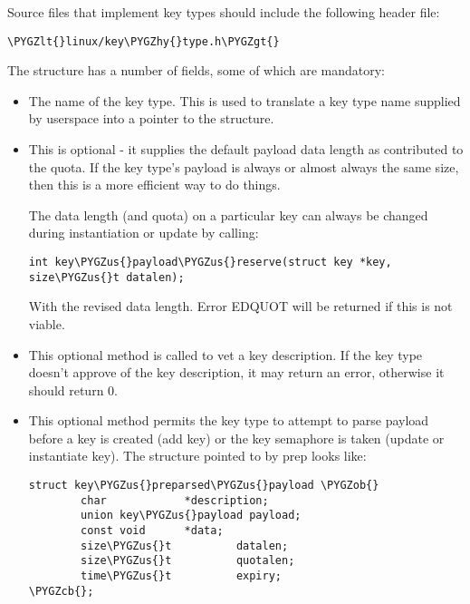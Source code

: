 \documentclass[a4paper,8pt,english]{sphinxmanual}
\def\PYGZus{\char`\_}
\def\PYGZob{\char`\{}
\def\PYGZcb{\char`\}}
\def\PYGZlt{\char`\<}
\def\PYGZgt{\char`\>}
\def\PYGZhy{\char`\-}
\begin{document}
Source files that implement key types should include the following header file:

\begin{Verbatim}[commandchars=\\\{\}]
\PYGZlt{}linux/key\PYGZhy{}type.h\PYGZgt{}
\end{Verbatim}

The structure has a number of fields, some of which are mandatory:
\begin{itemize}
\item {} 

The name of the key type. This is used to translate a key type name
supplied by userspace into a pointer to the structure.

\item {} 

This is optional - it supplies the default payload data length as
contributed to the quota. If the key type's payload is always or almost
always the same size, then this is a more efficient way to do things.

The data length (and quota) on a particular key can always be changed
during instantiation or update by calling:

\begin{Verbatim}[commandchars=\\\{\}]
int key\PYGZus{}payload\PYGZus{}reserve(struct key *key, size\PYGZus{}t datalen);
\end{Verbatim}

With the revised data length. Error EDQUOT will be returned if this is not
viable.

\item {} 

This optional method is called to vet a key description.  If the key type
doesn't approve of the key description, it may return an error, otherwise
it should return 0.

\item {} 

This optional method permits the key type to attempt to parse payload
before a key is created (add key) or the key semaphore is taken (update or
instantiate key).  The structure pointed to by prep looks like:

\begin{Verbatim}[commandchars=\\\{\}]
struct key\PYGZus{}preparsed\PYGZus{}payload \PYGZob{}
        char            *description;
        union key\PYGZus{}payload payload;
        const void      *data;
        size\PYGZus{}t          datalen;
        size\PYGZus{}t          quotalen;
        time\PYGZus{}t          expiry;
\PYGZcb{};
\end{Verbatim}


\end{itemize}
\end{document}
